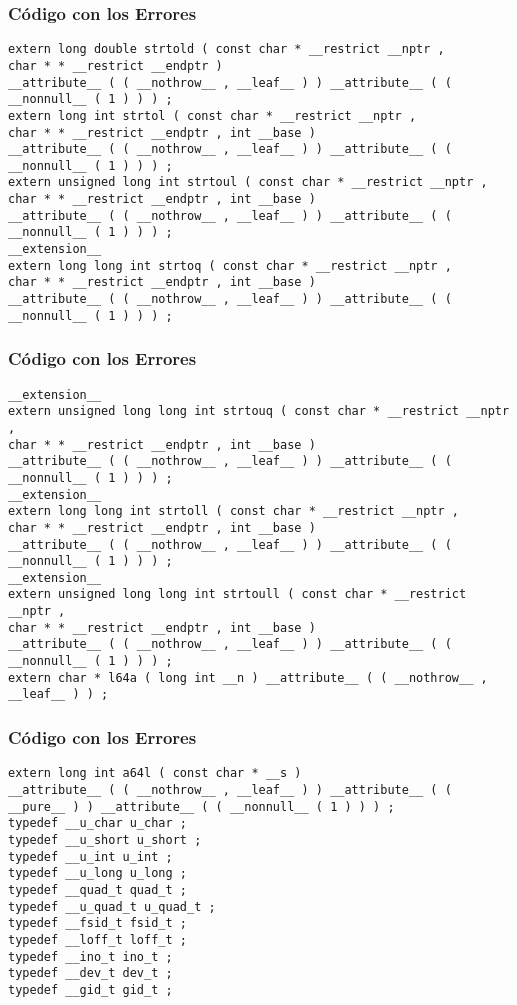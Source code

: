 \documentclass{beamer}
\begin{document}
\begin{frame}[fragile]
\frametitle{C\'odigo con los Errores}
\begin{lstlisting}[style=CStyle]
extern long double strtold ( const char * __restrict __nptr , 
char * * __restrict __endptr ) 
__attribute__ ( ( __nothrow__ , __leaf__ ) ) __attribute__ ( ( __nonnull__ ( 1 ) ) ) ; 
extern long int strtol ( const char * __restrict __nptr , 
char * * __restrict __endptr , int __base ) 
__attribute__ ( ( __nothrow__ , __leaf__ ) ) __attribute__ ( ( __nonnull__ ( 1 ) ) ) ; 
extern unsigned long int strtoul ( const char * __restrict __nptr , 
char * * __restrict __endptr , int __base ) 
__attribute__ ( ( __nothrow__ , __leaf__ ) ) __attribute__ ( ( __nonnull__ ( 1 ) ) ) ; 
__extension__ 
extern long long int strtoq ( const char * __restrict __nptr , 
char * * __restrict __endptr , int __base ) 
__attribute__ ( ( __nothrow__ , __leaf__ ) ) __attribute__ ( ( __nonnull__ ( 1 ) ) ) ; 
\end{lstlisting}
\end{frame}
\begin{frame}[fragile]
\frametitle{C\'odigo con los Errores}
\begin{lstlisting}[style=CStyle]
__extension__ 
extern unsigned long long int strtouq ( const char * __restrict __nptr , 
char * * __restrict __endptr , int __base ) 
__attribute__ ( ( __nothrow__ , __leaf__ ) ) __attribute__ ( ( __nonnull__ ( 1 ) ) ) ; 
__extension__ 
extern long long int strtoll ( const char * __restrict __nptr , 
char * * __restrict __endptr , int __base ) 
__attribute__ ( ( __nothrow__ , __leaf__ ) ) __attribute__ ( ( __nonnull__ ( 1 ) ) ) ; 
__extension__ 
extern unsigned long long int strtoull ( const char * __restrict __nptr , 
char * * __restrict __endptr , int __base ) 
__attribute__ ( ( __nothrow__ , __leaf__ ) ) __attribute__ ( ( __nonnull__ ( 1 ) ) ) ; 
extern char * l64a ( long int __n ) __attribute__ ( ( __nothrow__ , __leaf__ ) ) ; 
\end{lstlisting}
\end{frame}
\begin{frame}[fragile]
\frametitle{C\'odigo con los Errores}
\begin{lstlisting}[style=CStyle]
extern long int a64l ( const char * __s ) 
__attribute__ ( ( __nothrow__ , __leaf__ ) ) __attribute__ ( ( __pure__ ) ) __attribute__ ( ( __nonnull__ ( 1 ) ) ) ; 
typedef __u_char u_char ; 
typedef __u_short u_short ; 
typedef __u_int u_int ; 
typedef __u_long u_long ; 
typedef __quad_t quad_t ; 
typedef __u_quad_t u_quad_t ; 
typedef __fsid_t fsid_t ; 
typedef __loff_t loff_t ; 
typedef __ino_t ino_t ; 
typedef __dev_t dev_t ; 
typedef __gid_t gid_t ; 
\end{lstlisting}
\end{frame}
\end{document}
